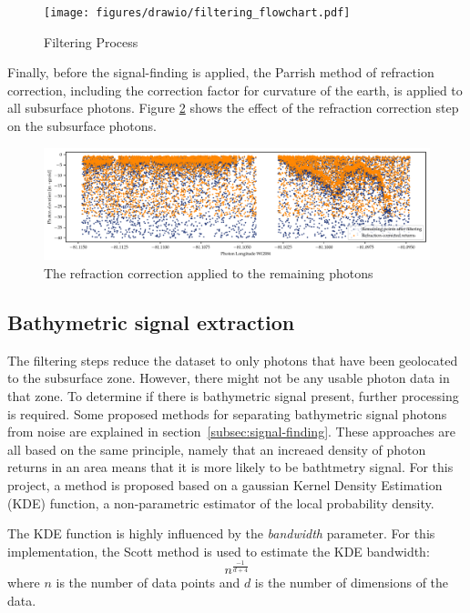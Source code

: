 \begin{figure}[htb]
    \centering
    \texttt{[image: figures/drawio/filtering\_flowchart.pdf]}
    \caption{Filtering Process}
    \label{fig:filtering-flowchart}
\end{figure}

Finally, before the signal-finding is applied, the Parrish method of refraction correction, including the correction factor for curvature of the earth, is applied to all subsurface photons. Figure \ref{fig:refraction-photons} shows the effect of the refraction correction step on the subsurface photons.

\begin{figure}[htb]
    \centering
    \includegraphics[width=\textwidth]{figures/methodology_refraction.pdf}
    \caption{The refraction correction applied to the remaining photons}
    \label{fig:refraction-photons}
\end{figure}

\subsection{Bathymetric signal extraction}\label{subsec:kdesignalfinding}

The filtering steps reduce the dataset to only photons that have been geolocated to the subsurface zone. However, there might not be any usable photon data in that zone. To determine if there is bathymetric signal present, further processing is required. Some proposed methods for separating bathymetric signal photons from noise are explained in section~\ref{subsec:signal-finding}. These approaches are all based on the same principle, namely that an increaed density of photon returns in an area means that it is more likely to be bathtmetry signal. For this project, a method is proposed based on a gaussian Kernel Density Estimation (KDE) function, a non-parametric estimator of the local probability density. 

The KDE function is highly influenced by the \emph{bandwidth} parameter. For this implementation, the Scott method \parencite{Scott2015} is used to estimate the KDE bandwidth: $$ n^{\frac{-1}{d+4}} $$ where $n$ is the number of data points and $d$ is the number of dimensions of the data. 

